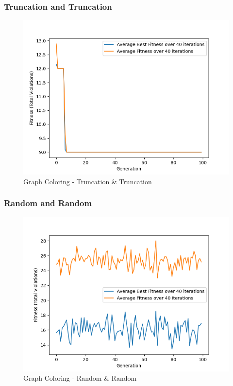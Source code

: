 \documentclass[11pt, letterpaper]{article}
\begin{document}
\subsubsection {Truncation and Truncation}
\begin{figure}[H]
    \centering
    \includegraphics[scale = 0.6]{images/graphcoloring_tr_tr.png}
    \caption {Graph Coloring - Truncation \& Truncation}
    \label {fig:gcTT}
\end{figure}

\subsubsection {Random and Random}
\begin{figure}[H]
    \centering
    \includegraphics[scale = 0.6]{images/graphcoloring_rd_rd.png}
    \caption {Graph Coloring - Random \& Random}
    \label {fig:gcRR}
\end{figure}
\end{document}
